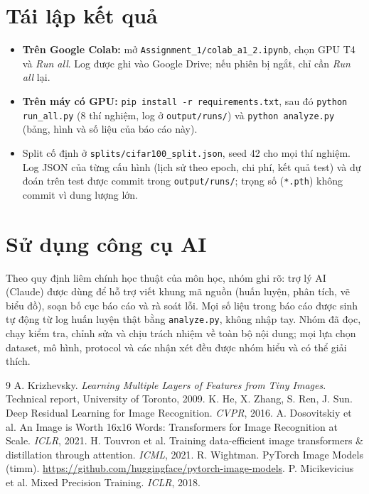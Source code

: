 \documentclass[12pt]{article}
\newcommand{\code}[1]{\texttt{#1}}
\newcommand{\st}[1]{\textbf{#1}}
\begin{document}
\section{Tái lập kết quả}
\begin{itemize}
  \item \st{Trên Google Colab:} mở \code{Assignment\_1/colab\_a1\_2.ipynb}, chọn GPU T4 và \emph{Run all}. Log được ghi
        vào Google Drive; nếu phiên bị ngắt, chỉ cần \emph{Run all} lại.
  \item \st{Trên máy có GPU:} \code{pip install -r requirements.txt}, sau đó \code{python run\_all.py} (8 thí nghiệm,
        log ở \code{output/runs/}) và \code{python analyze.py} (bảng, hình và số liệu của báo cáo này).
  \item Split cố định ở \code{splits/cifar100\_split.json}, seed 42 cho mọi thí nghiệm. Log JSON của từng cấu hình
        (lịch sử theo epoch, chi phí, kết quả test) và dự đoán trên test được commit trong \code{output/runs/};
        trọng số (\code{*.pth}) không commit vì dung lượng lớn.
\end{itemize}

\section{Sử dụng công cụ AI}
Theo quy định liêm chính học thuật của môn học, nhóm ghi rõ: trợ lý AI (Claude) được dùng để hỗ trợ viết khung mã nguồn
(huấn luyện, phân tích, vẽ biểu đồ), soạn bố cục báo cáo và rà soát lỗi. Mọi số liệu trong báo cáo được sinh tự động từ
log huấn luyện thật bằng \code{analyze.py}, không nhập tay. Nhóm đã đọc, chạy kiểm tra, chỉnh sửa và chịu trách nhiệm
về toàn bộ nội dung; mọi lựa chọn dataset, mô hình, protocol và các nhận xét đều được nhóm hiểu và có thể giải thích.

\begin{thebibliography}{9}
 A. Krizhevsky. \emph{Learning Multiple Layers of Features from Tiny Images}. Technical report, University of Toronto, 2009.
 K. He, X. Zhang, S. Ren, J. Sun. Deep Residual Learning for Image Recognition. \emph{CVPR}, 2016.
 A. Dosovitskiy et al. An Image is Worth 16x16 Words: Transformers for Image Recognition at Scale. \emph{ICLR}, 2021.
 H. Touvron et al. Training data-efficient image transformers \& distillation through attention. \emph{ICML}, 2021.
 R. Wightman. PyTorch Image Models (timm). \url{https://github.com/huggingface/pytorch-image-models}.
 P. Micikevicius et al. Mixed Precision Training. \emph{ICLR}, 2018.
\end{thebibliography}
\end{document}
